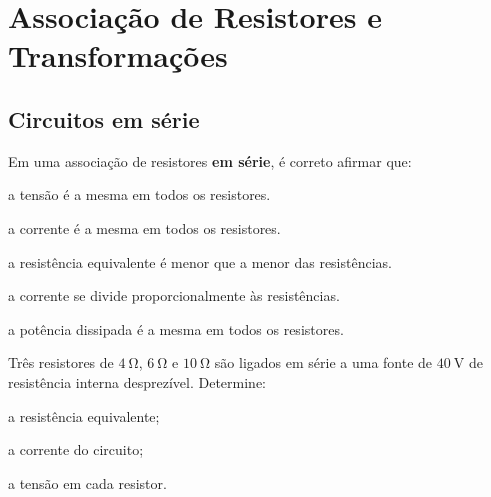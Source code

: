 
\section{Associação de Resistores e Transformações}

\subsection{Circuitos em série}

\blocofixacao
\begin{questao}[1]{}

Em uma associação de resistores \textbf{em série}, é correto afirmar que:
\begin{alternativas}
\item a tensão é a mesma em todos os resistores.
\item a corrente é a mesma em todos os resistores.
\item a resistência equivalente é menor que a menor das resistências.
\item a corrente se divide proporcionalmente às resistências.
\item a potência dissipada é a mesma em todos os resistores.
\end{alternativas}


\end{questao}
\begin{questao}[1]{}

Três resistores de $\SI{4}{\ohm}$, $\SI{6}{\ohm}$ e $\SI{10}{\ohm}$ são ligados em
série a uma fonte de $\SI{40}{\volt}$ de resistência interna desprezível.
Determine:
\begin{itensq}
\item a resistência equivalente;
\item a corrente do circuito;
\item a tensão em cada resistor.
\end{itensq}


\end{questao}
